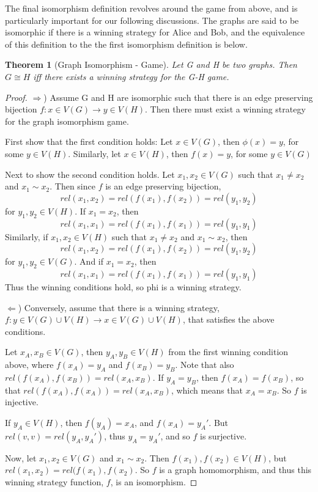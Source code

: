 \documentclass[12pt]{article}
\newtheorem{Theorem}{Theorem}
\theoremstyle{definition}
\theoremstyle{proposition}
\theoremstyle{lemma}
\begin{document}
The final isomorphism definition revolves around the game from above, and is particularly important for our following discussions. The graphs are said to be isomorphic if there is a winning strategy for Alice and Bob, and the equivalence of this definition to the the first isomorphism definition is below.

\begin{Theorem}[Graph Isomorphism - Game]
Let G and H be two graphs. Then $G \cong H$ iff there exists a winning strategy for the G-H game.
\end{Theorem}

\begin{proof}
$\Rightarrow$) Assume G and H are isomorphic such that there is an edge preserving bijection $f: x \in V(G) \to y \in V(H)$. Then there must exist a winning strategy for the graph isomorphism game. 

First show that the first condition holds: Let $x \in V(G)$, then $\phi(x) = y$, for some $y \in V(H)$. Similarly, let $x \in V(H)$, then $f(x) = y$, for some $y \in V(G)$

Next to show the second condition holds. Let $x_1, x_2 \in V(G)$ such that $x_1 \neq x_2$ and $x_1 \sim x_2$. Then since $f$ is an edge preserving bijection, 
\begin{equation}
rel(x_1, x_2) = rel(f(x_1), f(x_2)) = rel(y_1, y_2)
\end{equation}
for $y_1, y_2 \in V(H)$. If $x_1 = x_2$, then 
\begin{equation}
rel(x_1, x_1) = rel(f(x_1), f(x_1)) = rel(y_1, y_1)
\end{equation}
Similarly, if $x_1, x_2 \in V(H)$ such that $x_1 \neq x_2$ and $x_1 \sim x_2$, then  
\begin{equation}
rel(x_1, x_2) = rel(f(x_1), f(x_2)) = rel(y_1, y_2)
\end{equation}
for $y_1, y_2 \in V(G)$. And if $x_1 = x_2$, then 
\begin{equation}
rel(x_1, x_1) = rel(f(x_1), f(x_1)) = rel(y_1, y_1)
\end{equation}
Thus the winning conditions hold, so phi is a winning strategy.

$\Leftarrow$) Conversely, assume that there is a winning strategy, $f: y \in V(G)\cup V(H) \to x \in V(G) \cup V(H)$, that satisfies the above conditions. 

Let $x_A, x_B \in V(G)$, then $y_A, y_B \in V(H)$ from the first winning condition above, where $f(x_A) = y_A$ and $f(x_B) = y_B$. Note that also $rel(f(x_A), f(x_B)) = rel(x_A, x_B)$. If $y_A = y_B$, then $f(x_A) = f(x_B)$, so that $rel(f(x_A), f(x_A)) = rel(x_A, x_B)$, which means that $x_A = x_B$. So $f$ is injective. 

If $y_A \in V(H)$, then $f(y_A) = x_A$, and $f(x_A) = y_A'$. But $rel(v, v) = rel(y_A, y_A')$, thus $y_A = y_A'$, and so $f$ is surjective. 

Now, let $x_1, x_2 \in V(G)$ and $x_1 \sim x_2$. Then $f(x_1), f(x_2) \in V(H)$, but $rel(x_1, x_2) = rel(f(x_1), f(x_2)$. So $f$ is a  graph homomorphism, and thus this winning strategy function, $f$, is an isomorphism.

\end{proof}
\end{document}

